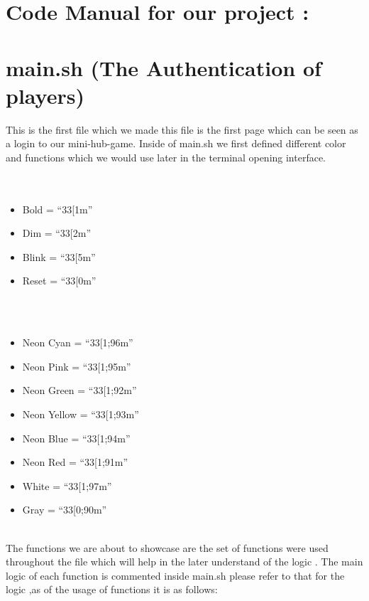 \documentclass{article}
\begin{document}
\section*{Code Manual for our project :}
\section{main.sh (The Authentication of players)}
This is the first file which we made this file is the first page which can be seen as a login to our mini-hub-game.
Inside of main.sh we first defined different color and functions which we would use later in the terminal opening interface. \\\\
\noindent {}
\\
\begin{itemize}[leftmargin=1.5em, topsep=0pt, itemsep=0pt]

    \item Bold = ``33[1m''
    \item Dim = ``33[2m''
    \item Blink = ``33[5m''
    \item Reset = ``33[0m''
    \\
    \\
\end{itemize}

\vspace{0.5em}

\noindent {}
\\
\begin{itemize}[leftmargin=1.5em, topsep=0pt, itemsep=0pt]
    \\
    \item Neon Cyan = ``33[1;96m''
    \item Neon Pink = ``33[1;95m''
    \item Neon Green = ``33[1;92m''
    \item Neon Yellow = ``33[1;93m''
    \item Neon Blue = ``33[1;94m''
    \item Neon Red = ``33[1;91m''
    \item White = ``33[1;97m''
    \item Gray = ``33[0;90m''
    \\
    \\
\end{itemize}
\newpage
The functions we are about to showcase are the set of functions were used throughout the file which will help in the later understand of the logic . The main logic of each function is commented inside main.sh please refer to that for the logic ,as of the usage of functions it is as follows:
\end{document}

